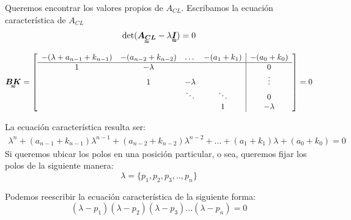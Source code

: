 Queremos encontrar los valores propios de $A_{CL}$. Escribamos la ecuación característica de $A_{CL}$
\begin{align*}
    \det(\tenq{A_{CL}}-\lambda \tenq{I})=0
\end{align*}

\begin{align*}
\tenq{BK}=\left[
    \begin{array}{cccc|c}
     -(\lambda+a_{n-1}+k_{n-1}) & -(a_{n-2}+k_{n-2}) & \dots & -(a_1+k_1) & -(a_0+k_0)\\ \hline
      1 & -\lambda & & & 0\\
      & 1 & -\lambda & & \vdots\\
      & & \ddots & \ddots & 0\\
      & & & 1 & -\lambda\\
    \end{array}\right]=0
\end{align*}

La ecuación característica resulta ser:
\begin{align*}
    \lambda^n+(a_{n-1}+k_{n-1})\lambda^{n-1}+(a_{n-2}+k_{n-2})\lambda^{n-2}+...+(a_{1}+k_{1})\lambda+(a_{0}+k_{0})=0
\end{align*}
Si queremos ubicar los polos en una posición particular, o sea, queremos fijar los polos de la siguiente manera:
$$ \lambda=\{p_1,p_2,p_3,..,p_n \}$$

Podemos reescribir la ecuación característica de la siguiente forma:
$$(\lambda-p_1)(\lambda-p_2)(\lambda-p_3)...(\lambda-p_n)=0 $$

